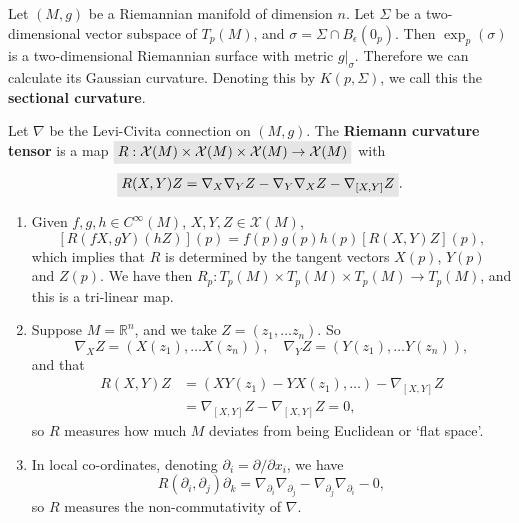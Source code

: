\documentclass[letter-paper]{tufte-book}
\newenvironment{remark}[1][Remark]{\begin{trivlist}
\item[\hskip \labelsep {\bfseries #1}]}{\end{trivlist}}
\newcommand{\highlight}[1]{\mathchoice%
  {\colorbox{black!10}{$\displaystyle#1$}}%
  {\colorbox{black!10}{$\textstyle#1$}}%
  {\colorbox{black!10}{$\scriptstyle#1$}}%
  {\colorbox{black!10}{$\scriptscriptstyle#1$}}}%
\begin{document}
Let $(M,g)$ be a Riemannian manifold of dimension $n$. Let $\Sigma$ be a two-dimensional vector subspace of $T_p(M)$, and $\sigma = \Sigma \cap B_\epsilon(0_p)$. Then $\exp_p(\sigma)$ is a two-dimensional Riemannian surface with metric $g|_\sigma$. Therefore we can calculate its Gaussian curvature. Denoting this by $K(p, \Sigma)$, we call this the \textbf{sectional curvature}.

Let $\nabla$ be the Levi-Civita connection on $(M,g)$. The \textbf{Riemann curvature tensor} is a map $\highlight{R: \mathcal{X}(M) \times \mathcal{X}(M) \times \mathcal{X}(M) \to \mathcal{X}(M)}$ with
\begin{equation}
  \highlight{R(X,Y)Z = \nabla_X \nabla_Y Z - \nabla_Y \nabla_X Z - \nabla_{[X,Y]} Z}.
\end{equation}

\begin{remark}
  \begin{enumerate}
    \item Given $f,g,h \in C^\infty(M)$, $X, Y, Z \in \mathcal{X}(M)$,
    \begin{equation*}
      \left[R(fX, gY)(hZ)\right](p) = f(p)g(p)h(p) \left[R(X,Y)Z\right](p),
    \end{equation*}
    which implies that $R$ is determined by the tangent vectors $X(p)$, $Y(p)$ and $Z(p)$. We have then $R_p: T_p(M) \times T_p(M) \times T_p(M) \to T_p(M)$, and this is a tri-linear map.
    
    \item Suppose $M=\mathbb{R}^n$, and we take $Z = (z_1,\ldots z_n)$. So
    \begin{equation*}
      \nabla_X Z = (X(z_1), \ldots X(z_n)), \quad \nabla_Y Z = (Y(z_1), \ldots Y(z_n)),
    \end{equation*}
    and that
    \begin{align*}
      R(X,Y)Z 
        &= (XY(z_1) - YX(z_1), \ldots) - \nabla_{[X,Y]}Z\\
        &= \nabla_{[X,Y]}Z - \nabla_{[X,Y]}Z = 0,
    \end{align*}
    so $R$ measures how much $M$ deviates from being Euclidean or `flat space'.
    
    \item In local co-ordinates, denoting $\partial_i = \partial / \partial x_i$, we have
    \begin{equation*}
      R(\partial_i, \partial_j) \partial_k = \nabla_{\partial_i} \nabla_{\partial_j} - \nabla_{\partial_j}\nabla_{\partial_i} - 0,
    \end{equation*}
    so $R$ measures the non-commutativity of $\nabla$.
  \end{enumerate}
\end{remark}
\end{document}
